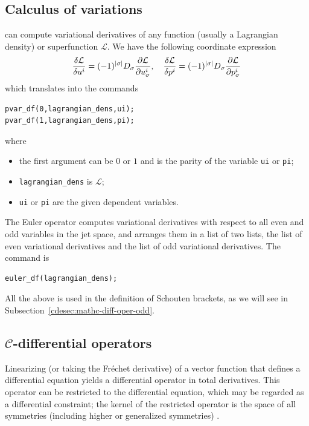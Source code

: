 \subsection{Calculus of variations}
\label{cdesec:calculus-variations}

\cde can compute variational derivatives of any function (usually a Lagrangian
density) or superfunction $\mathcal{L}$. We have the following coordinate
expression
\begin{equation}
  \label{eq:9}
  \fd{\mathcal{L}}{u^i} = (-1)^{|\sigma|}D_\sigma\pd{\mathcal{L}}{u^i_\sigma},
  \quad
    \fd{\mathcal{L}}{p^i} = (-1)^{|\sigma|}D_\sigma\pd{\mathcal{L}}{p^i_\sigma}
\end{equation}
which translates into the \cde commands
\begin{verbatim}
pvar_df(0,lagrangian_dens,ui);
pvar_df(1,lagrangian_dens,pi);
\end{verbatim}
where
\hypertarget{operator:PVAR_DF}{}
\begin{itemize}
\item the first argument can be $0$ or $1$ and is the parity of the variable
  \texttt{ui} or \texttt{pi};
\item \texttt{lagrangian\_dens} is $\mathcal{L}$;
\item \texttt{ui} or \texttt{pi} are the given dependent variables.
\end{itemize}
The Euler operator computes variational derivatives with respect to all even
and odd variables in the jet space, and arranges them in a list of two lists,
the list of even variational derivatives and the list of odd variational
derivatives. The command is
\hypertarget{operator:EULER_DF}{}
\begin{verbatim}
euler_df(lagrangian_dens);
\end{verbatim}
All the above is used in the definition of Schouten brackets, as we will see in
Subsection~\ref{cdesec:mathc-diff-oper-odd}.

\subsection[C-differential operators]{$\mathcal{C}$-differential operators}
\label{cdesec:mathc-diff-oper-1}

Linearizing (or taking the Fr\'echet derivative) of a vector function that
defines a differential equation yields a differential operator in total
derivatives. This operator can be restricted to the differential equation,
which may be regarded as a differential constraint; the kernel of the
restricted operator is the space of all symmetries (including higher or
generalized symmetries) \cite{Krasilshchik:99,Olver:93}.

